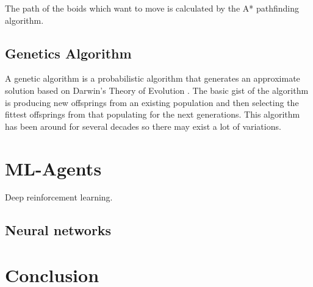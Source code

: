 \documentclass[a4paper, 12pt]{book}
\begin{document}
The path of the boids which want to move is calculated by the A* pathfinding algorithm.

\section{Genetics Algorithm}

A genetic algorithm is a probabilistic algorithm that generates an approximate solution based on Darwin’s Theory of Evolution \cite{GameAIGeneticAlg}. The basic gist of the algorithm is producing new offsprings from an existing population and then selecting the fittest offsprings from that populating for the next generations. This algorithm has been around for several decades so there may exist a lot of variations.

\chapter{ML-Agents}
\label{ch3}

Deep reinforcement learning.

\section{Neural networks}

\chapter{Conclusion}
\label{ch4}



\cleardoublepage
{}


\end{document}
